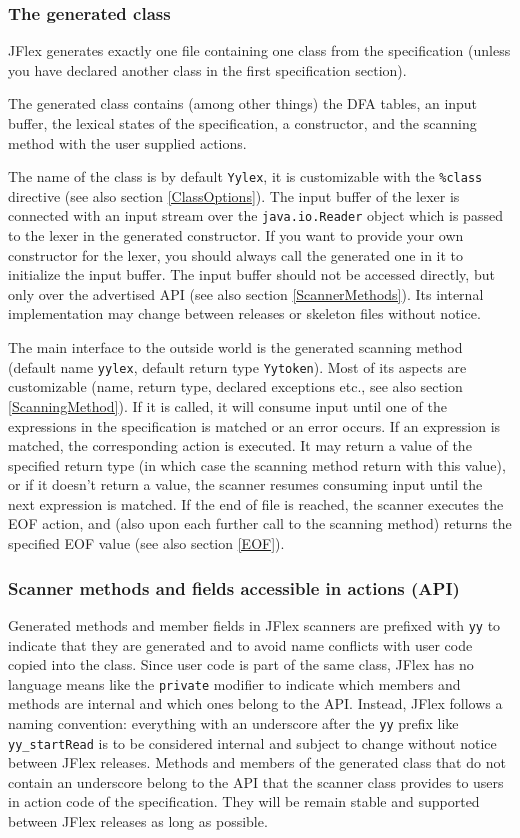 \documentclass[11pt]{scrartcl}
\begin{document}
\subsubsection{The generated class}
JFlex generates exactly one file containing one class from the specification
(unless you have declared another class in the first specification section).

The generated class contains (among other things) the DFA tables, an input buffer, 
the lexical states of the specification, a constructor, and the scanning method
with the user supplied actions.

The name of the class is by default \texttt{Yylex}, it is customizable
with the \texttt{\%class} directive (see also section
\ref{ClassOptions}). The input buffer of the lexer is connected with an
input stream over the \texttt{java.io.Reader} object which is passed
to the lexer in the generated constructor. If you want to provide your
own constructor for the lexer, you should always call the generated
one in it to initialize the input buffer. The input buffer should not
be accessed directly, but only over the advertised API (see also
section \ref{ScannerMethods}). Its internal implementation may change
between releases or skeleton files without notice.

The main interface to the outside world is the generated scanning
method (default name \texttt{yylex}, default return type
\texttt{Yytoken}). Most of its aspects are customizable (name, return
type, declared exceptions etc., see also section
\ref{ScanningMethod}).  If it is called, it will consume input until
one of the expressions in the specification is matched or an error
occurs. If an expression is matched, the corresponding action is
executed. It may return a value of the specified return type (in which
case the scanning method return with this value), or if it doesn't
return a value, the scanner resumes consuming input until the next
expression is matched. If the end of file is reached, the scanner
executes the EOF action, and (also upon each further call to the scanning
method) returns the specified EOF value (see also section \ref{EOF}).


\subsubsection{Scanner methods and fields accessible in actions (API)\label{ScannerMethods}}
Generated methods and member fields in JFlex scanners are prefixed
with \texttt{yy} to indicate that they are generated and to avoid name
conflicts with user code copied into the class. Since user code is
part of the same class, JFlex has no language means like the \texttt{private}
modifier to indicate which members and methods are internal and
which ones belong to the API. Instead, JFlex follows a naming convention:
everything with an underscore after the \texttt{yy} prefix like \texttt{yy\_startRead} 
is to be considered internal and subject to change without notice between
JFlex releases. Methods and members of the generated class that
do not contain an underscore belong to the API that the scanner class
provides to users in action code of the specification. They will be
remain stable and supported between JFlex releases as long as possible.
\end{document}
